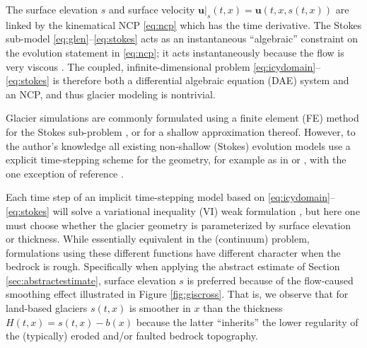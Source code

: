 \documentclass[hidelinks,onefignum,onetabnum,final]{siamart220329}  %
\newcommand{\bu}{\mathbf{u}}
\begin{document}
The surface elevation $s$ and surface velocity $\bu|_s(t,x)=\bu(t,x,s(t,x))$ are linked by the kinematical NCP \eqref{eq:ncp} which has the time derivative.  The Stokes sub-model \eqref{eq:glen}--\eqref{eq:stokes} acts as an instantaneous ``algebraic'' constraint on the evolution statement in \eqref{eq:ncp}; it acts instantaneously because the flow is very viscous \cite{Acheson1990}.  The coupled, infinite-dimensional problem \eqref{eq:icydomain}--\eqref{eq:stokes} is therefore both a differential algebraic equation (DAE) system \cite{AscherPetzold1998} and an NCP, and thus glacier modeling is nontrivial.

Glacier simulations are commonly formulated using a finite element (FE) method for the Stokes sub-problem \cite{IsaacStadlerGhattas2015,Jouvetetal2008,Pattynetal2008}, or for a shallow approximation thereof.  However, to the author's knowledge all existing non-shallow (Stokes) evolution models use a explicit time-stepping scheme for the geometry, for example as in \cite{Jouvetetal2008} or \cite{LofgrenAhlkronaHelanow2022}, with the one exception of reference \cite{WirbelJarosch2020}.

Each time step of an implicit time-stepping model based on \eqref{eq:icydomain}--\eqref{eq:stokes} will solve a variational inequality (VI) weak formulation \cite{Evans2010,KinderlehrerStampacchia1980}, but here one must choose whether the glacier geometry is parameterized by surface elevation or thickness.  While essentially equivalent in the (continuum) problem, formulations using these different functions have different character when the bedrock is rough.  Specifically when applying the abstract estimate of Section \ref{sec:abstractestimate}, surface elevation $s$ is preferred because of the flow-caused smoothing effect illustrated in Figure \ref{fig:giscross}.  That is, we observe that for land-based glaciers $s(t,x)$ is smoother in $x$ than the thickness $H(t,x) = s(t,x)-b(x)$ because the latter ``inherits'' the lower regularity of the (typically) eroded and/or faulted bedrock topography.
\end{document}
